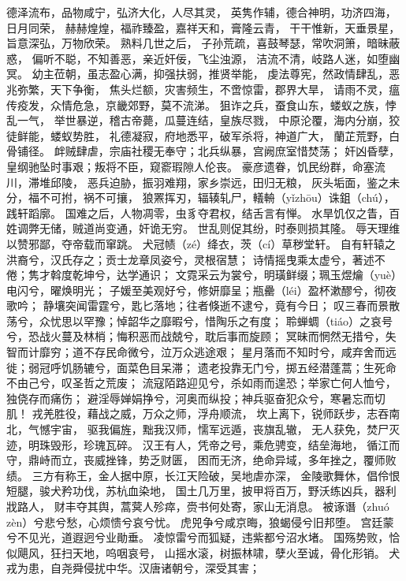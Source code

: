 \documentclass[12pt,oneside]{book}
\begin{document}
德泽流布，品物咸宁，弘济大化，人尽其灵，
英隽作辅，德合神明，功济四海，日月同荣，
赫赫煌煌，福祚臻盈，嘉祥天和，膏隆云青，
干干惟新，天垂景星，旨意深弘，万物欣荣。
熟料几世之后，
子孙荒疏，喜鼓琴瑟，常吹洞箫，暗昧蔽惑，
偏听不聪，不知善恶，亲近奸佞，飞尘浊源，
洁流不清，岐路人迷，如堕幽冥。
幼主莅朝，虽志盈心满，抑强扶弱，推贤举能，
虔法尊宪，然政情肆乱，恶兆弥繁，天下争衡，
焦头烂额，灾害频生，不啻惊雷，郡界大旱，
请雨不灵，瘟传疫发，众情危急，京畿郊野，莫不流涕。
狙诈之兵，蚕食山东，蝼蚁之族，悖乱一气，
举世暴逆，稽古帝薨，瓜蔓连结，皇族尽戮，
中原沦覆，海内分崩，狡徒鲜能，蝼蚁势胜，
礼德凝寂，府地悉平，破军杀将，神道广大，
蘭芷荒野，白骨铺径。
衅贼肆虐，宗庙社稷无奉守；北兵纵暴，宫阙庶室惜焚荡；
奸凶昏孽，皇纲驰坠时事艰；叛将不臣，窥窬瑕隙人伦丧。
豪彦遗眷，饥民纷群，命塞流川，滞堆邱陵，
恶兵迫胁，振羽难翔，家乡崇远，田归无粮，
灰头垢面，鉴之未分，福不可拊，祸不可攘，
狼罴挥刃，辐辏轧尸，轙輈（yǐzhōu）诛鉏（chú），践轩蹈廓。
国难之后，人物凋零，虫豸夺君权，结舌言有惮。
水旱饥仅之眚，百姓调弊无储，贼道尚变通，奸诡无穷。
世乱则促其纷，时泰则损其隆。
辱天理维以赞邪鄙，夺帝载而窜跳。
犬冠帻（zé）绛衣，茨（cí）草秽堂轩。
自有轩辕之洪裔兮，汉氏存之；贡士龙章凤姿兮，灵根宿慧；
诗情摇曳乘太虚兮，著述不倦；隽才斡度乾坤兮，达学通识；
文霓采云为裳兮，明璜鲜缀；珮玉煜爚（yuè）电闪兮，曜焕明光；
子媛至美观好兮，修妍靡呈；瓶罍（léi）盈杯漱醪兮，彻夜歌吟；
静壤突闻雷霆兮，匙匕落地；往者倏逝不逮兮，竟有今日；
叹三春而景散荡兮，众忧思以罕豫；悼韶华之靡暇兮，惜陶乐之有度；
聆蝉蜩（tiáo）之哀号兮，恐战火蔓及林梢；悔积恶而战兢兮，耽后事而旋顾；
冥昧而惘然无措兮，失智而计靡穷；道不存民命微兮，泣万众逃途艰；
星月落而不知时兮，咸弃舍而远徙；弱冠呼饥肠辘兮，面菜色目呆滞；
遗老投靠无门兮，掷五经潜蓬蒿；生死命不由己兮，叹圣哲之荒废；
流寇陌路迎见兮，杀如雨而遑恐；举家亡何人恤兮，独侥存而痛伤；
避淫辱婵娟挣兮，河奥而纵投；神兵驱奋犯众兮，寒暑忘而切肌！
戎羌胜役，藉战之威，万众之师，浮舟顺流，
坎上离下，锐师跃步，志吞南北，气憾宇宙，
驱我偏旌，黜我汉师，懦军远遁，丧旗乱辙，
无人获免，焚尸灭迹，明珠毁形，珍瑰瓦碎。
汉王有人，凭帝之号，乘危骋变，结垒海地，
循江而守，鼎峙而立，丧威挫锋，势乏财匮，
困而无济，绝命异域，多年挫之，覆师败绩。
三方有称王，金人据中原，长江天险破，吴地虐亦深，
金陵歌舞休，倡伶恨短腿，骏犬矜功伐，苏杭血染地，
国土几万里，披甲将百万，野沃练凶兵，器利戕路人，
财丰夺其舆，蒿蓂人殄瘁，赍书何处寄，家山无消息。
被诼谮（zhuó zèn）兮悲兮愁，心烦愦兮哀兮忧。
虎兕争兮咸京晦，狼蝎侵兮旧邦堕。
宫廷蒙兮不见光，道遐迥兮业勛垂。
凌惊雷兮而狐疑，违紫都兮沼水堵。
国殇势败，恰似飓风，狂扫天地，呜咽哀号，
山摇水滚，树振林啸，孽火至诚，骨化形销。
犬戎为患，自尧舜侵扰中华。汉唐诸朝兮，深受其害；
\end{document}
